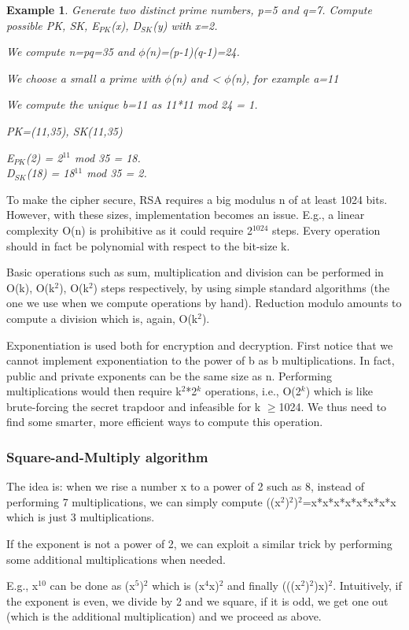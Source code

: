 \documentclass[a4paper, 12pt]{report}
\newtheorem{example}{\textbf{Example}}
\begin{document}
\begin{example}
	Generate two distinct prime numbers, p=5 and q=7. Compute possible PK, SK, E$_{PK}$(x), D$_{SK}$(y) with x=2.
	
	We compute n=pq=35 and $\phi$(n)=(p-1)(q-1)=24.
	
	We choose a small a prime with $\phi$(n) and < $\phi$(n), for example a=11
	
	We compute the unique b=11 as 11*11 mod 24 = 1.
	
	PK=(11,35), SK(11,35)
	
	E$_{PK}$(2) = 2$^11$ mod 35 = 18.\\
	D$_{SK}$(18) = 18$^11$ mod 35 = 2.
\end{example}

To make the cipher secure, RSA requires a big modulus n of at least 1024 bits. However, with these sizes, implementation becomes an issue. E.g., a linear complexity O(n) is prohibitive as it could require 2$^{1024}$ steps. Every operation should in fact be polynomial with respect to the bit-size k.

Basic operations such as sum, multiplication and division can be performed in O(k), O(k$^2$), O(k$^2$) steps respectively, by using simple standard algorithms (the one we use when we compute operations by hand). Reduction modulo amounts to compute a division which is, again, O(k$^2$).

Exponentiation is used both for encryption and decryption. First notice that we cannot implement exponentiation to the power of b as b multiplications. In fact, public and private exponents can be the same size as n. Performing multiplications would then require k$^2$*2$^k$ operations, i.e., O(2$^k$) which is like brute-forcing the secret trapdoor and infeasible for k $\ge$1024. We thus need to find some smarter, more efficient ways to compute this operation.

\subsubsection{Square-and-Multiply algorithm}
The idea is: when we rise a number x to a power of 2 such as 8, instead of performing 7 multiplications, we can simply compute ((x$^2$)$^2$)$^2$=x*x*x*x*x*x*x*x which is just 3 multiplications.

If the exponent is not a power of 2, we can exploit a similar trick by performing some additional multiplications when needed.

E.g., x$^{10}$ can be done as (x$^5$)$^2$ which is (x$^4$x)$^2$ and finally (((x$^2$)$^2$)x)$^2$. Intuitively, if the exponent is even, we divide by 2 and we square, if it is odd, we get one out (which is the additional multiplication) and we proceed as above.
\end{document}
